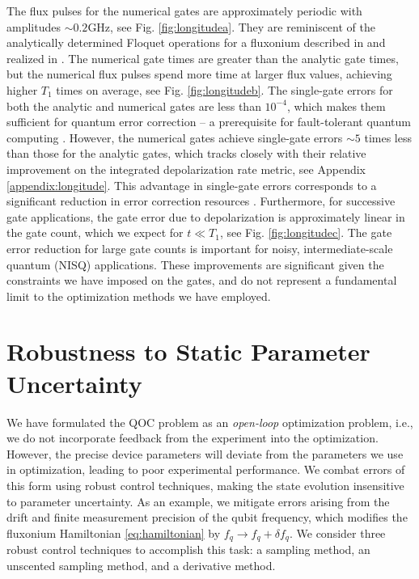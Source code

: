 \documentclass[
  amsfonts,
  amsmath,
  amssymb,
  pra,
  twocolumn,
  superscriptaddress,
]{revtex4-2}
\begin{document}
The flux pulses for the numerical gates
are approximately periodic
with amplitudes $\sim 0.2 \textrm{GHz}$, see Fig. \ref{fig:longitudea}.
They are reminiscent of the analytically determined Floquet operations
for a fluxonium described in \cite{huang2021engineering}
and realized in \cite{mundada2020floquet}.
The numerical gate times are greater
than the analytic gate times, but the
numerical flux pulses
spend more time at larger flux values, achieving higher $T_{1}$ times on average,
see Fig. \ref{fig:longitudeb}.
The single-gate errors for both the analytic and numerical gates are
less than $10^{-4}$, which makes them sufficient for quantum error correction -- a
prerequisite for fault-tolerant quantum
computing \cite{aharonov2008fault, knill2005quantum, gottesman1997stabilizer}.
However, the numerical gates achieve single-gate errors
$\sim 5$ times less than those for the analytic gates,
which tracks closely with their relative improvement
on the integrated depolarization rate metric, see Appendix \ref{appendix:longitude}.
This advantage in single-gate errors corresponds to a
significant reduction in error correction resources
\cite{paetznick2014resource, suchara2013comparing}.
Furthermore, for successive gate applications,
the gate error due to depolarization is approximately linear
in the gate count, which we expect for $t \ll T_{1}$, see Fig. \ref{fig:longitudec}.
The gate error reduction for large gate counts is
important for noisy, intermediate-scale quantum (NISQ)
applications. These improvements are significant given the constraints
we have imposed on the gates,
and do not represent a fundamental limit to the optimization
methods we have employed.


\section{Robustness to Static Parameter Uncertainty \label{sec:static}}
We have formulated the QOC
problem as an \emph{open-loop} optimization problem, i.e.,
we do not incorporate feedback from the experiment into the optimization.
However, the precise device parameters will deviate from the parameters we use in optimization,
leading to poor experimental performance. We combat errors
of this form using robust control techniques,
making the state evolution insensitive
to parameter uncertainty. As an example,
we mitigate errors arising from the drift and finite measurement
precision of the qubit frequency, which modifies the fluxonium Hamiltonian
\eqref{eq:hamiltonian} by $f_{q} \rightarrow f_{q} + \delta f_{q}$.
We consider three robust control techniques to accomplish this task:
a sampling method, an unscented sampling method,
and a derivative method.
\end{document}
